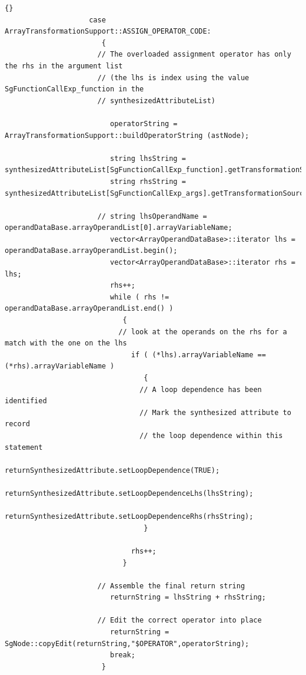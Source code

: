 \documentclass[10pt]{article}
\begin{document}
{\begin{lstlisting}{}
                    case ArrayTransformationSupport::ASSIGN_OPERATOR_CODE:
                       {
                      // The overloaded assignment operator has only the rhs in the argument list
                      // (the lhs is index using the value SgFunctionCallExp_function in the
                      // synthesizedAttributeList)

                         operatorString = ArrayTransformationSupport::buildOperatorString (astNode);

                         string lhsString = synthesizedAttributeList[SgFunctionCallExp_function].getTransformationSourceCode();
                         string rhsString = synthesizedAttributeList[SgFunctionCallExp_args].getTransformationSourceCode();

                      // string lhsOperandName = operandDataBase.arrayOperandList[0].arrayVariableName;
                         vector<ArrayOperandDataBase>::iterator lhs = operandDataBase.arrayOperandList.begin();
                         vector<ArrayOperandDataBase>::iterator rhs = lhs;
                         rhs++;
                         while ( rhs != operandDataBase.arrayOperandList.end() )
                            {
                           // look at the operands on the rhs for a match with the one on the lhs
                              if ( (*lhs).arrayVariableName == (*rhs).arrayVariableName )
                                 {
                                // A loop dependence has been identified
                                // Mark the synthesized attribute to record 
                                // the loop dependence within this statement
                                   returnSynthesizedAttribute.setLoopDependence(TRUE);
                                   returnSynthesizedAttribute.setLoopDependenceLhs(lhsString);
                                   returnSynthesizedAttribute.setLoopDependenceRhs(rhsString);
                                 }

                              rhs++;
                            }

                      // Assemble the final return string
                         returnString = lhsString + rhsString;

                      // Edit the correct operator into place
                         returnString = SgNode::copyEdit(returnString,"$OPERATOR",operatorString);
                         break;
                       }


\end{lstlisting}}
\end{document}
